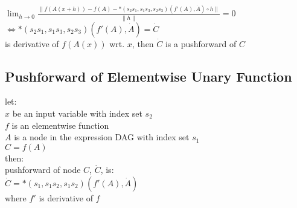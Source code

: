 \documentclass[8pt]{extarticle}
\begin{document}
\begin{multicols*}{2}
  $\lim_{h \rightarrow 0} \frac{\| f(A(x+h)) - f(A) - *(s_2 s_1, s_1 s_3, s_2 s_3)(f'(A), \dot{A}) \circ h \|}{\|h\|} = 0$ \\
  $\iff *(s_2 s_1, s_1 s_3, s_2 s_3)(f'(A), \dot{A}) = \dot{C}$ \\
  is derivative of $f(A(x))$ wrt. $x$, then $\dot{C}$ is a pushforward of $C$
  
  \vfill\null
  \columnbreak

  \subsection{Pushforward of Elementwise Unary Function}
  let:\\
  $x$ be an input variable with index set $s_2$\\
  $f$ is an elementwise function\\
  $A$ is a node in the expression DAG with index set $s_1$\\
  $C=f(A)$\\
  then:\\
  pushforward of node $C$, $\dot{C}$, is:\\
  $\dot{C} = *(s_1, s_1 s_2, s_1 s_2)(f'(A), \dot{A})$\\
  where $f'$ is derivative of $f$


\end{multicols*}
\end{document}
